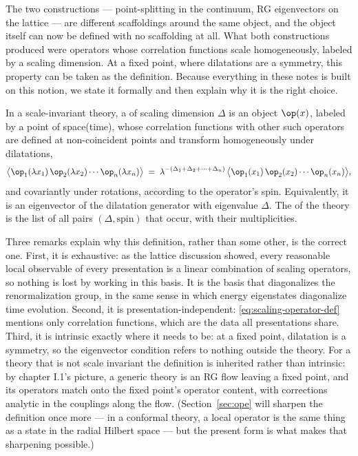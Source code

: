 The two constructions --- point-splitting in the continuum, RG eigenvectors
on the lattice --- are different scaffoldings around the same object, and the
object itself can now be defined with no scaffolding at all. What both
constructions produced were operators whose correlation functions scale
homogeneously, labeled by a scaling dimension. At a fixed point, where
dilatations are a symmetry, this property can be taken as the definition.
Because everything in these notes is built on this notion, we state it
formally and then explain why it is the right choice.

\begin{ddefinition}
\label{def:local-operator}
In a scale-invariant theory, a  of scaling dimension
$\Delta$ is an object $\op(x)$, labeled by a point of space(time), whose
correlation functions with other such operators are defined at non-coincident
points and transform homogeneously under dilatations,
\begin{equation}
\big\langle \op_1(\lambda x_1)\, \op_2(\lambda x_2) \cdots
\op_n(\lambda x_n)\big\rangle
\;=\; \lambda^{-(\Delta_1 + \Delta_2 + \cdots + \Delta_n)}\,
\big\langle \op_1(x_1)\, \op_2(x_2)\cdots \op_n(x_n)\big\rangle ,
\label{eq:scaling-operator-def}
\end{equation}
and covariantly under rotations, according to the operator's spin.
Equivalently, it is an eigenvector of the dilatation generator with
eigenvalue $\Delta$. The  of the theory is the list
of all pairs $(\Delta, \text{spin})$ that occur, with their multiplicities.
\end{ddefinition}

\noin Three remarks explain why this definition, rather than some other, is
the correct one. First, it is exhaustive: as the lattice discussion showed,
every reasonable local observable of every presentation is a linear
combination of scaling operators, so nothing is lost by working in this
basis. It is the basis that diagonalizes the renormalization group, in the
same sense in which energy eigenstates diagonalize time evolution. Second,
it is presentation-independent: \eqref{eq:scaling-operator-def} mentions only
correlation functions, which are the data all presentations share. Third, it
is intrinsic exactly where it needs to be: at a fixed point, dilatation is a
symmetry, so the eigenvector condition refers to nothing outside the theory.
For a theory that is not scale invariant the definition is inherited rather
than intrinsic: by chapter I.1's picture, a generic theory is an RG flow
leaving a fixed point, and its operators match onto the fixed point's
operator content, with corrections analytic in the couplings along the flow.
(Section~\ref{sec:ope} will sharpen the definition once more --- in a
conformal theory, a local operator is the same thing as a state in the radial
Hilbert space --- but the present form is what makes that sharpening
possible.)

